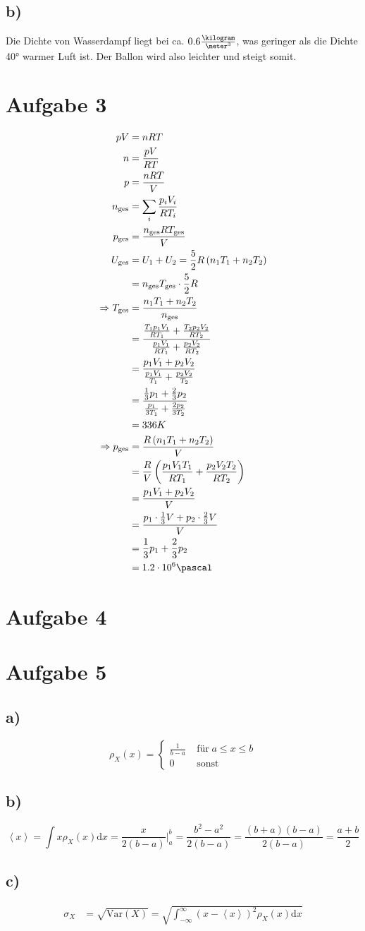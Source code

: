 \documentclass[12pt,a4paper,notitlepage]{article}
\newcommand{\diff}{\mathrm{d}}
\newcommand{\aufgabe}[1]{\section*{\setcounter{section}{#1}Aufgabe #1}}
\begin{document}
\subsection*{b)}
Die Dichte von Wasserdampf liegt bei ca. $0.6\frac{\kilogram}{\meter^3}$, was geringer als die Dichte 40° warmer Luft ist. Der Ballon wird also leichter und steigt somit.
\aufgabe{3}
\begin{align}
pV&=nRT\\
n&=\frac{pV}{RT}\\
p&=\frac{nRT}{V}\\
n_\text{ges}&=\sum_i\frac{p_iV_i}{RT_i}\\
p_\text{ges}&=\frac{n_\text{ges}RT_\text{ges}}{V}\\
U_\text{ges}&=U_1+U_2=\frac{5}{2}R\left(n_1T_1+n_2T_2\right)\\
&=n_\text{ges}T_\text{ges}\cdot\frac{5}{2}R\\
\Rightarrow T_\text{ges}&=\frac{n_1T_1+n_2T_2}{n_\text{ges}}\\
&=\frac{\frac{T_1p_1V_1}{RT_1}+\frac{T_2p_2V_2}{RT_2}}{\frac{p_1V_1}{RT_1}+\frac{p_2V_2}{RT_2}}\\
&=\frac{p_1V_1+p_2V_2}{\frac{p_1V_1}{T_1}+\frac{p_2V_2}{T_2}}\\
&=\frac{\frac{1}{3}p_1+\frac{2}{3}p_2}{\frac{p_1}{3T_1}+\frac{2p_2}{3T_2}}\\
&=336K\\
\Rightarrow p_\text{ges}&=\frac{R\left(n_1T_1+n_2T_2\right)}{V}\\
&=\frac{R}{V}\left(\frac{p_1V_1T_1}{RT_1}+\frac{p_2V_2T_2}{RT_2}\right)\\
&=\frac{p_1V_1+p_2V_2}{V}\\
&=\frac{p_1\cdot\frac{1}{3}V+p_2\cdot\frac{2}{3}V}{V}\\
&=\frac{1}{3}p_1+\frac{2}{3}p_2\\
&=1.2\cdot 10^6\pascal
\end{align}
\aufgabe{4}
\aufgabe{5}
\subsection*{a)}
\begin{equation}
\rho_X(x)=\left\{\begin{matrix}\frac{1}{b-a}&\;\text{für}\;a\leq x\leq b\\0&\;\text{sonst}\end{matrix}\right.
\end{equation}
\subsection*{b)}
\begin{equation}
\left<x\right>=\int x\rho_X(x)\diff x=\frac{x}{2(b-a)}\big|_a^b=\frac{b^2-a^2}{2(b-a)}=\frac{(b+a)(b-a)}{2(b-a)}=\frac{a+b}{2}
\end{equation}
\subsection*{c)}
\begin{align}
\sigma_X&=\sqrt{\mathrm{Var}(X)}=\sqrt{\int_{-\infty}^{\infty} (x-\left<x\right>)^2\rho_X(x)\diff x}
\end{align}
\end{document}
